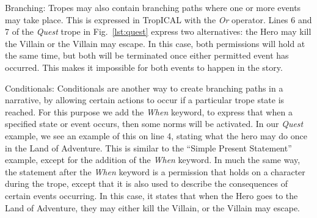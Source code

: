 \begin{compactdesc}
\item[Branching:]
Tropes may also contain branching paths where one or more events may take place. This is expressed in TropICAL with the \emph{Or} operator. Lines 6 and 7 of the \emph{Quest} trope in Fig.~\ref{lst:quest} express two alternatives: the Hero may kill the Villain or the Villain may escape. In this case, both permissions will hold at the same time, but both will be terminated once either permitted event has occurred. This makes it impossible for both events to happen in the story.

\item[Conditionals:]
Conditionals are another way to create branching paths in a narrative, by allowing certain actions to occur if a particular trope state is reached. For this purpose we add the \emph{When} keyword, to express that when a specified state or event occurs, then some norms will be activated. In our \emph{Quest} example, we see an example of this on line 4, stating what the hero may do once in the Land of Adventure. This is similar to the ``Simple Present Statement'' example, except for the addition of the \emph{When} keyword. In much the same way, the statement after the \emph{When} keyword is a permission that holds on a character during the trope, except that it is also used to describe the consequences of certain events occurring. In this case, it states that when the Hero goes to the Land of Adventure, they may either kill the Villain, or the Villain may escape.


\end{compactdesc}
